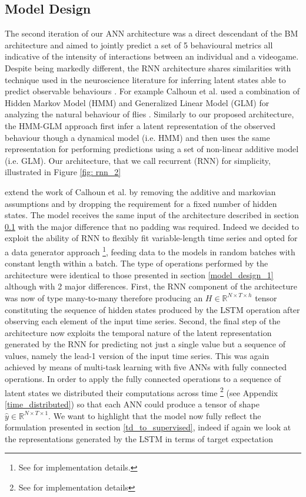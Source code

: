 \subsection{Model Design}
\label{model_design_2}
The second iteration of our ANN architecture was a direct descendant of the BM architecture and aimed to jointly predict a set of 5 behavioural metrics all indicative of the intensity of interactions between an individual and a videogame. Despite being markedly different, the RNN architecture shares similarities with technique used in the neuroscience literature for inferring latent states able to predict observable behaviours \cite{calhoun2019unsupervised}. For example Calhoun et al. used a combination of Hidden Markov Model (HMM) and Generalized Linear Model (GLM) for analyzing the natural behaviour of flies \cite{calhoun2019unsupervised}. Similarly to our proposed architecture, the HMM-GLM approach first infer a latent representation of the observed behaviour though a dynamical model (i.e. HMM) and then uses the same representation for performing predictions using a set of non-linear additive model (i.e. GLM). Our architecture, that we call recurrent (RNN) for simplicity, illustrated in Figure \ref{fig: rnn_2}

extend the work of Calhoun et al. by removing the additive and markovian assumptions and by dropping the requirement for a fixed number of hidden states. The model receives the same input of the architecture described in section \ref{model_design_2} with the major difference that no padding was required. Indeed we decided to exploit the ability of RNN to flexibly fit variable-length time series and opted for a data generator approach \footnote{See \cite{chollet2015keras,tensorflow2015-whitepaper} for implementation details.}, feeding data to the models in random batches with constant length within a batch. The type of operations performed by the architecture were identical to those presented in section \ref{model_design_1} although with 2 major differences. First, the RNN component of the architecture was now of type many-to-many therefore producing an $H \in \mathbb{R}^{N \times T \times h}$ tensor constituting the sequence of hidden states produced by the LSTM operation after observing each element of the input time series\cite{bengio2017deep}. Second, the final step of the architecture now exploits the temporal nature of the latent representation generated by the RNN for predicting not just a single value but a sequence of values, namely the lead-1 version of the input time series. This was again achieved by means of multi-task learning with five ANNs with fully connected operations. In order to apply the fully connected operations to a sequence of latent states we distributed their computations across time \footnote{See \cite{chollet2015keras} for implementation details} (see Appendix \ref{time_distributed}) so that each ANN could produce a tensor of shape $\hat{y} \in \mathbb{R}^{N \times T \times 1}$. We want to highlight that the model now fully reflect the formulation presented in section \ref{td_to_supervised}, indeed if again we look at the representations generated by the LSTM in terms of target expectation
